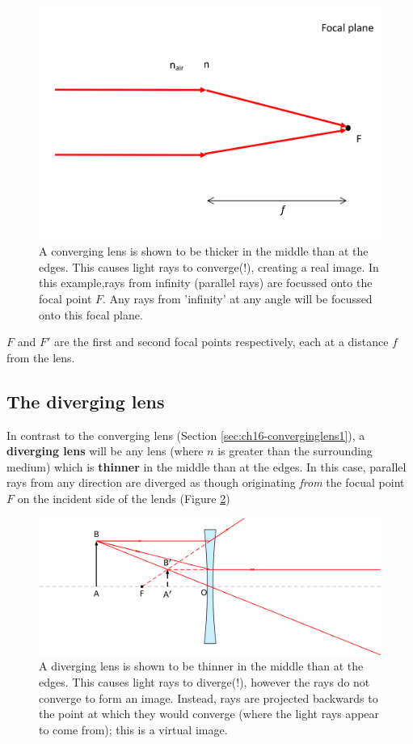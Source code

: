 \documentclass[
]{book}
\begin{document}
\begin{figure}

{\centering \includegraphics[width=0.7\linewidth]{visualisations/LaTeX/ch16-focalplane1} 

}

\caption{A converging lens is shown to be thicker in the middle than at the edges. This causes light rays to converge(!), creating a real image. In this example,rays from infinity (parallel rays) are focussed onto the focal point $F$. Any rays from 'infinity' at any angle will be focussed onto this focal plane.}\label{fig:ch16-converginglens1}
\end{figure}

\(F\) and \(F'\) are the first and second focal points respectively, each at a distance \(f\) from the lens.

\hypertarget{sec:ch16-diverginglens1}{%
\subsection{The diverging lens}\label{sec:ch16-diverginglens1}}

In contrast to the converging lens (Section \ref{sec:ch16-converginglens1}), a \textbf{diverging lens} will be any lens (where \(n\) is greater than the surrounding medium) which is \textbf{thinner} in the middle than at the edges. In this case, parallel rays from any direction are diverged as though originating \emph{from} the focual point \(F\) on the incident side of the lends (Figure \ref{fig:ch16-diverginglens1})

\begin{figure}

{\centering \includegraphics[width=0.7\linewidth]{visualisations/LaTeX/ch16-diverginglens1} 

}

\caption{A diverging lens is shown to be thinner in the middle than at the edges. This causes light rays to diverge(!), however the rays do not converge to form an image. Instead, rays are projected backwards to the point at which they would converge (where the light rays appear to come from); this is a virtual image. }\label{fig:ch16-diverginglens1}
\end{figure}
\end{document}
